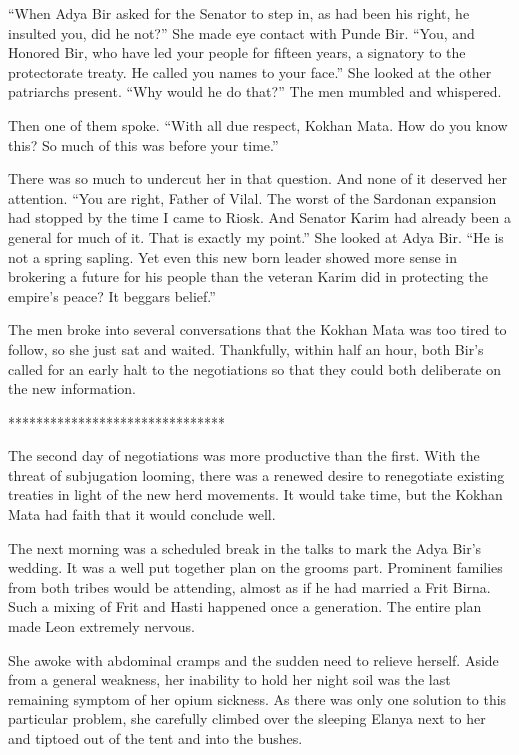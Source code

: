 \documentclass{article}
\begin{document}
	“When Adya Bir asked for the Senator to step in, as had been his right, he insulted you, did he not?” She made eye contact with Punde Bir. “You, and Honored Bir, who have led your people for fifteen years, a signatory to the protectorate treaty. He called you names to your face.” She looked at the other patriarchs present. “Why would he do that?” The men mumbled and whispered.
	
	Then one of them spoke. “With all due respect, Kokhan Mata. How do you know this? So much of this was before your time.” 
	
	There was so much to undercut her in that question. And none of it deserved her attention. “You are right, Father of Vilal. The worst of the Sardonan expansion had stopped by the time I came to Riosk. And Senator Karim had already been a general for much of it. That is exactly my point.” She looked at Adya Bir. “He is not a spring sapling. Yet even this new born leader showed more sense in brokering a future for his people than the veteran Karim did in protecting the empire’s peace? It beggars belief.” 
	
	The men broke into several conversations that the Kokhan Mata was too tired to follow, so she just sat and waited. Thankfully, within half an hour, both Bir’s called for an early halt to the negotiations so that they could both deliberate on the new information.
	
	*******************************
	
	The second day of negotiations was more productive than the first. With the threat of subjugation looming, there was a renewed desire to renegotiate existing treaties in light of the new herd movements. It would take time, but the Kokhan Mata had faith that it would conclude well.
	
	The next morning was a scheduled break in the talks to mark the Adya Bir’s wedding. It was a well put together plan on the grooms part. Prominent families from both tribes would be attending, almost as if he had married a Frit Birna. Such a mixing of Frit and Hasti happened once a generation. The entire plan made Leon extremely nervous.
	
	She awoke with abdominal cramps and the sudden need to relieve herself. Aside from a general weakness, her inability to hold her night soil was the last remaining symptom of her opium sickness. As there was only one solution to this particular problem, she carefully climbed over the sleeping Elanya next to her and tiptoed out of the tent and into the bushes. 
	
\end{document}
